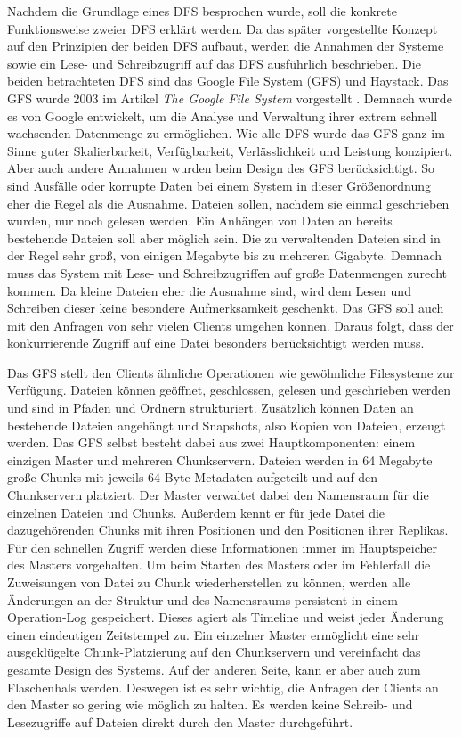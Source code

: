 \documentclass[12pt,oneside,a4paper,parskip]{scrbook}
\begin{document}
Nachdem die Grundlage eines DFS besprochen wurde, soll die konkrete Funktionsweise zweier DFS erklärt werden. Da das später vorgestellte Konzept auf den Prinzipien der beiden DFS aufbaut, werden die Annahmen der Systeme sowie ein Lese- und Schreibzugriff auf das DFS ausführlich beschrieben. Die beiden betrachteten DFS sind das Google File System (GFS) und Haystack.
Das GFS wurde 2003 im Artikel \textit{The Google File System} vorgestellt \cite{GFS}. Demnach wurde es von Google entwickelt, um die Analyse und Verwaltung ihrer extrem schnell wachsenden Datenmenge zu ermöglichen. Wie alle DFS wurde das GFS ganz im Sinne guter Skalierbarkeit, Verfügbarkeit, Verlässlichkeit und Leistung konzipiert. Aber auch andere Annahmen wurden beim Design des GFS berücksichtigt. So sind Ausfälle oder korrupte Daten bei einem System in dieser Größenordnung eher die Regel als die Ausnahme. Dateien sollen, nachdem sie einmal geschrieben wurden, nur noch gelesen werden. Ein Anhängen von Daten an bereits bestehende Dateien soll aber möglich sein. Die zu verwaltenden Dateien sind in der Regel sehr groß, von einigen Megabyte bis zu mehreren Gigabyte. Demnach muss das System mit Lese- und Schreibzugriffen auf große Datenmengen zurecht kommen. Da kleine Dateien eher die Ausnahme sind, wird dem Lesen und Schreiben dieser keine besondere Aufmerksamkeit geschenkt. Das GFS soll auch mit den Anfragen von sehr vielen Clients umgehen können. Daraus folgt, dass der konkurrierende Zugriff auf eine Datei besonders berücksichtigt werden muss.  

Das GFS stellt den Clients ähnliche Operationen wie gewöhnliche Filesysteme zur Ver\-fü\-gung. Dateien können geöffnet, geschlossen, gelesen und geschrieben werden und sind in Pfaden und Ordnern strukturiert. Zusätzlich können Daten an bestehende Dateien angehängt und Snapshots, also Kopien von Dateien, erzeugt werden. Das GFS selbst besteht dabei aus zwei Hauptkomponenten: einem einzigen Master und mehreren Chunkservern. Dateien werden in 64 Megabyte große Chunks mit jeweils 64 Byte Metadaten aufgeteilt und auf den Chunkservern platziert. Der Master verwaltet dabei den Namensraum für die einzelnen Dateien und Chunks. Außerdem kennt er für jede Datei die dazugehörenden Chunks mit ihren Positionen und den Positionen ihrer Replikas. Für den schnellen Zugriff werden diese Informationen immer im Hauptspeicher des Masters vorgehalten. Um beim Starten des Masters oder im Fehlerfall die Zuweisungen von Datei zu Chunk wiederherstellen zu können, werden alle Änderungen an der Struktur und des Namensraums persistent in einem Operation-Log gespeichert. Dieses agiert als Timeline und weist jeder Änderung einen eindeutigen Zeitstempel zu. Ein einzelner Master ermöglicht eine sehr ausgeklügelte Chunk-Platzierung auf den Chunkservern und vereinfacht das gesamte Design des Systems. Auf der anderen Seite, kann er aber auch zum Flaschenhals werden. Deswegen ist es sehr wichtig, die Anfragen der Clients an den Master so gering wie möglich zu halten. Es werden keine Schreib- und Lesezugriffe auf Dateien direkt durch den Master durchgeführt.
\end{document}
